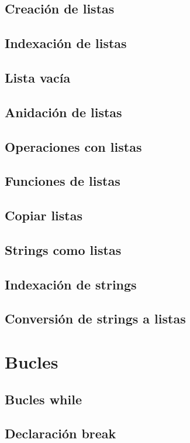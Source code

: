 \documentclass{article}
\begin{document}
      \subsection{Creación de listas}
      \subsection{Indexación de listas}
      \subsection{Lista vacía}
      \subsection{Anidación de listas}
      \subsection{Operaciones con listas}
      \subsection{Funciones de listas}
      \subsection{Copiar listas}
      \subsection{Strings como listas}
      \subsection{Indexación de strings}
      \subsection{Conversión de strings a listas}

    \section{Bucles}

      \subsection{Bucles while}
      \subsection{Declaración break}
\end{document}
